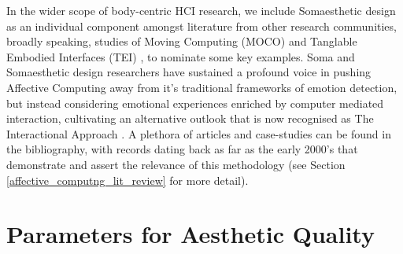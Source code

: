 In the wider scope of body-centric HCI research, we include Somaesthetic design as an individual component amongst literature from other research communities, broadly speaking, studies of Moving Computing (MOCO) \cite{zhou_dance_2021} and Tanglable Embodied Interfaces (TEI) \cite{li_meta-analysis_2022}, to nominate some key examples. Soma and Somaesthetic design researchers have sustained a profound voice in pushing Affective Computing away from it's traditional frameworks of emotion detection, but instead considering emotional experiences enriched by computer mediated interaction, cultivating an alternative outlook that is now recognised as The Interactional Approach \citep{hook_affective_2009}. A plethora of articles and case-studies can be found in the bibliography, with records dating back as far as the early 2000's that demonstrate and assert the relevance of this methodology (see Section \ref{affective_computng_lit_review} for more detail).








\section {Parameters for Aesthetic Quality}

